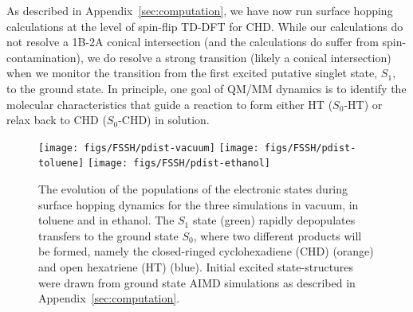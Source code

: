 \documentclass[journal=jctcce,manuscript=article,layout=traditional]{achemso}
\begin{document}
As described in Appendix~\ref{sec:computation}, we have now run surface hopping calculations at the level of spin-flip TD-DFT for CHD.  While our calculations do not resolve a 1B-2A conical intersection (and the calculations do suffer from spin-contamination\cite{herbert2015:sasf}), we do resolve a strong transition (likely a conical intersection) %
%
when we monitor the transition from the first excited putative singlet state, $S_1$, to the ground state. In principle, one goal of QM/MM dynamics is to identify the molecular characteristics that guide a reaction to form either  HT ($S_0$-HT) or relax back to CHD ($S_0$-CHD) in solution.

\begin{figure}
    \centering
    \texttt{[image: figs/FSSH/pdist-vacuum]}
    \texttt{[image: figs/FSSH/pdist-toluene]}
    \texttt{[image: figs/FSSH/pdist-ethanol]}
    \caption{
      The evolution of the populations of the electronic states during surface hopping dynamics for the three simulations in vacuum, in toluene and in ethanol.
      The $S_1$ state (green) rapidly depopulates transfers to the ground state $S_0$, where two different products will be formed, namely the closed-ringed cyclohexadiene (CHD) (orange) and open hexatriene (HT) (blue). Initial excited state-structures were drawn from ground state AIMD simulations as described in Appendix~\ref{sec:computation}.
      \label{fig:populations}
    }
\end{figure}
\end{document}

